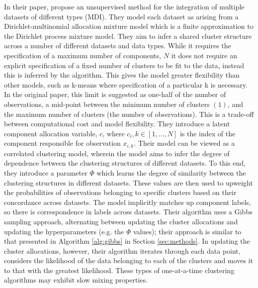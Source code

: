 \documentclass[10pt,a4paper]{article}
\begin{document}
In their paper, \citeauthor{kirk2012bayesian}\cite{kirk2012bayesian} propose an unsupervised method for the integration of multiple datasets of different types (MDI). They model each dataset as arising from a Dirichlet-multinomial allocation mixture model which is a finite approximation to the Dirichlet process mixture model. They aim to infer a shared cluster structure across a number of different datasets and data types. While it requires the specification of a maximum number of components, $N$ it does not require an explicit specification of a fixed number of clusters to be fit to the data, instead this is inferred by the algorithm. This gives the model greater flexibility than other models, such as k-means where specification of a particular k is necessary. In the original paper, this limit is suggested as one-half of the number of observations, a mid-point between the minimum number of clusters $(1)$, and the maximum number of clusters (the number of observations). This is a trade-off between computational cost and model flexibility. They introduce a latent component allocation variable, $c$, where $c_i, k \in [1, \dots, N]$ is the index of the component responsible for observation $x_{i, k}$.  
Their model can be viewed as a correlated clustering model, wherein the model aims to infer the degree of dependence between the clustering structures of different datasets. To this end, they introduce a parameter $\Phi$ which learns the degree of similarity between the clustering structures in different datasets. These values are then used to upweight the probabilities of observations belonging to specific clusters based on their concordance across datasets. The model implicitly matches up component labels, so there is correspondence in labels across datasets. Their algorithm uses a Gibbs sampling approach, alternating between updating the cluster allocations and updating the hyperparameters (e.g. the $\Phi$ values); their approach is similar to that presented in Algorithm \ref{alg:gibbs} in Section \ref{sec:methods}. In updating the cluster allocations, however, their algorithm iterates through each data point, considers the likelihood of the data belonging to each of the clusters and moves it to that with the greatest likelihood. These types of one-at-a-time clustering algorithms may exhibit slow mixing properties.
\end{document}
